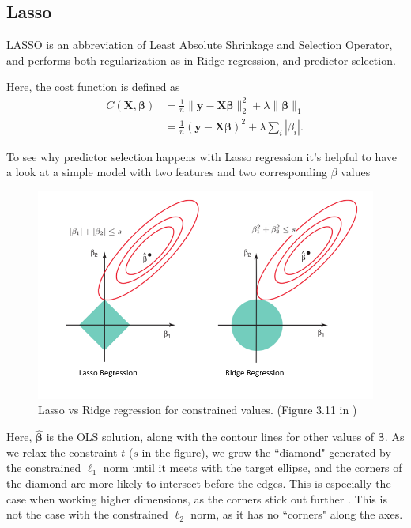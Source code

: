 \documentclass{article}
\begin{document}
\subsection{Lasso}
LASSO is an abbreviation of Least Absolute Shrinkage and Selection Operator, and performs both regularization as in Ridge regression, and predictor selection.

Here, the cost function is defined as
\begin{align*}
    C \left( \textbf{X}, \boldsymbol{\beta} \right) &= \frac{1}{n} \lVert \boldsymbol{y} - \textbf{X} \boldsymbol{\beta} \rVert_2^2 + \lambda \lVert \boldsymbol{\beta} \rVert_1 \\
    &= \frac{1}{n} \left( \boldsymbol{y} - \textbf{X} \boldsymbol{\beta} \right)^2 + \lambda \sum_i |\beta_i|.
\end{align*}

To see why predictor selection happens with Lasso regression it's helpful to have a look at a simple model with two features and two corresponding $\beta$ values

\begin{figure}
    \centering
    \includegraphics[width=\textwidth]{lasso_ridge_contour.png}
    \caption{Lasso vs Ridge regression for constrained values. (Figure 3.11 in \cite{Hastie2009})}
    \label{fig:LassoRidgeHastie}
\end{figure}

Here, $\boldsymbol{\hat{\beta}}$ is the OLS solution, along with the contour lines for other values of $\boldsymbol{\beta}$. As we relax the constraint $t$ ($s$ in the figure), we grow the ``diamond" generated by the constrained $\ell_1$ norm until it meets with the target ellipse, and the corners of the diamond are more likely to intersect before the edges. This is especially the case when working higher dimensions, as the corners stick out further \cite[p.~432--436]{Murphy2012}. This is not the case with the constrained $\ell_2$ norm, as it has no ``corners" along the axes.
\end{document}
